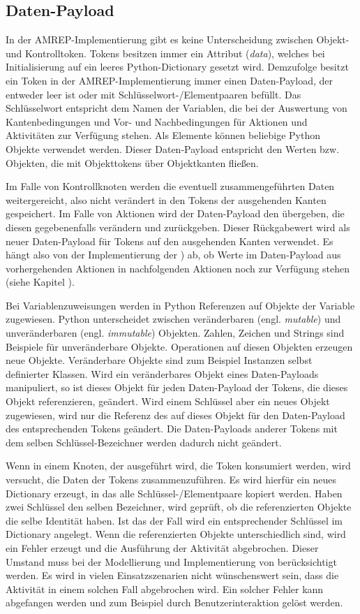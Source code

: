 \subsection{Daten-Payload}\label{token-data}
In der AMREP-Implementierung gibt es keine Unterscheidung zwischen Objekt- und Kontrolltoken. Tokens besitzen immer ein Attribut (\emph{data}), welches bei Initialisierung auf ein leeres Python-Dictionary gesetzt wird. Demzufolge besitzt ein Token in der AMREP-Implementierung immer einen Daten-Payload, der entweder leer ist oder mit Schlüsselwort-/Elementpaaren befüllt. Das Schlüsselwort entspricht dem Namen der Variablen, die bei der Auswertung von Kantenbedingungen und Vor- und Nachbedingungen für Aktionen und Aktivitäten zur Verfügung stehen. Als Elemente können beliebige Python Objekte verwendet werden. Dieser Daten-Payload entspricht den Werten bzw. Objekten, die mit Objekttokens über Objektkanten fließen.

Im Falle von Kontrollknoten werden die eventuell zusammengeführten Daten weitergereicht, also nicht verändert in den Tokens der ausgehenden Kanten gespeichert. Im Falle von Aktionen wird der Daten-Payload den  übergeben, die diesen gegebenenfalls verändern und zurückgeben. Dieser Rückgabewert  wird als neuer Daten-Payload für Tokens auf den ausgehenden Kanten verwendet. Es hängt also von der Implementierung der ) ab, ob Werte im Daten-Payload aus vorhergehenden Aktionen in nachfolgenden Aktionen noch zur Verfügung stehen (siehe Kapitel ).

Bei Variablenzuweisungen werden in Python Referenzen auf Objekte der Variable zugewiesen. Python unterscheidet zwischen veränderbaren (engl. \emph{mutable}) und unveränderbaren (engl. \emph{immutable}) Objekten. Zahlen, Zeichen und Strings sind Beispiele für unveränderbare Objekte. Operationen auf diesen Objekten erzeugen neue Objekte. Veränderbare Objekte sind zum Beispiel Instanzen selbst definierter Klassen. Wird ein veränderbares Objekt eines Daten-Payloads manipuliert, so ist dieses Objekt für jeden Daten-Payload der Tokens, die dieses Objekt referenzieren, geändert. Wird einem Schlüssel aber ein neues Objekt zugewiesen, wird nur die Referenz des auf dieses Objekt für den Daten-Payload des entsprechenden Tokens geändert. Die Daten-Payloads anderer Tokens mit dem selben Schlüssel-Bezeichner werden dadurch nicht geändert.

Wenn in einem Knoten, der ausgeführt wird, die Token konsumiert werden, wird versucht, die Daten der Tokens zusammenzuführen. Es wird hierfür ein neues Dictionary erzeugt, in das alle Schlüssel-/Elementpaare kopiert werden. Haben zwei Schlüssel den selben Bezeichner, wird geprüft, ob die referenzierten Objekte die selbe Identität haben. Ist das der Fall wird ein entsprechender Schlüssel im Dictionary angelegt. Wenn die referenzierten Objekte unterschiedlich sind, wird ein Fehler erzeugt und die Ausführung der Aktivität abgebrochen. Dieser Umstand muss bei der Modellierung und Implementierung von  berücksichtigt werden. Es wird in vielen Einsatzszenarien nicht wünschenswert sein, dass die Aktivität in einem solchen Fall abgebrochen wird. Ein solcher Fehler kann abgefangen werden und zum Beispiel durch Benutzerinteraktion gelöst werden.

